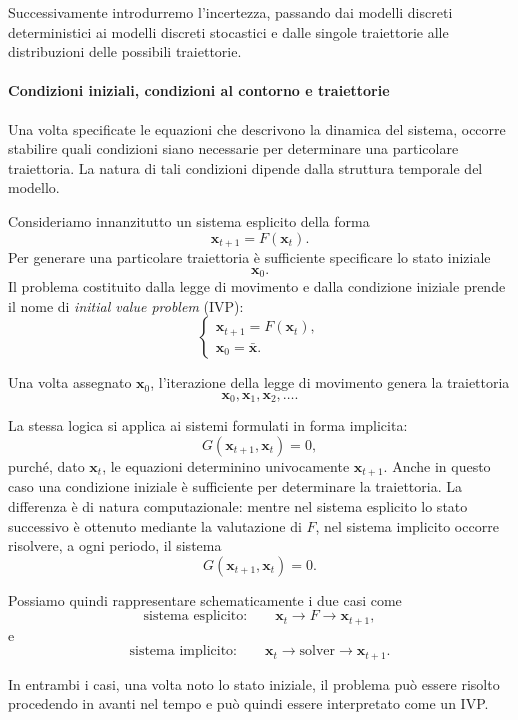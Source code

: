 \documentclass{book}
\begin{document}
Successivamente introdurremo l'incertezza, passando dai modelli
discreti deterministici ai modelli discreti stocastici e dalle singole
traiettorie alle distribuzioni delle possibili traiettorie.


\paragraph{Condizioni iniziali, condizioni al contorno e traiettorie}

Una volta specificate le equazioni che descrivono la dinamica del sistema,
occorre stabilire quali condizioni siano necessarie per determinare una
particolare traiettoria. La natura di tali condizioni dipende dalla
struttura temporale del modello.

Consideriamo innanzitutto un sistema esplicito della forma
\[
\mathbf{x}_{t+1}=F(\mathbf{x}_t).
\]
Per generare una particolare traiettoria è sufficiente specificare lo
stato iniziale
\[
\mathbf{x}_0.
\]
Il problema costituito dalla legge di movimento e dalla condizione
iniziale prende il nome di \emph{initial value problem} (IVP):
\[
\begin{cases}
\mathbf{x}_{t+1}=F(\mathbf{x}_t),\\
\mathbf{x}_0=\bar{\mathbf{x}}.
\end{cases}
\]

Una volta assegnato $\mathbf{x}_0$, l'iterazione della legge di
movimento genera la traiettoria
\[
\mathbf{x}_0,\mathbf{x}_1,\mathbf{x}_2,\ldots.
\]

La stessa logica si applica ai sistemi formulati in forma implicita:
\[
G(\mathbf{x}_{t+1},\mathbf{x}_t)=0,
\]
purché, dato $\mathbf{x}_t$, le equazioni determinino univocamente
$\mathbf{x}_{t+1}$. Anche in questo caso una condizione iniziale è
sufficiente per determinare la traiettoria. La differenza è di natura
computazionale: mentre nel sistema esplicito lo stato successivo è
ottenuto mediante la valutazione di $F$, nel sistema implicito occorre
risolvere, a ogni periodo, il sistema
\[
G(\mathbf{x}_{t+1},\mathbf{x}_t)=0.
\]

Possiamo quindi rappresentare schematicamente i due casi come
\[
\text{sistema esplicito:}
\qquad
\mathbf{x}_t
\longrightarrow
F
\longrightarrow
\mathbf{x}_{t+1},
\]
e
\[
\text{sistema implicito:}
\qquad
\mathbf{x}_t
\longrightarrow
\text{solver}
\longrightarrow
\mathbf{x}_{t+1}.
\]

In entrambi i casi, una volta noto lo stato iniziale, il problema può
essere risolto procedendo in avanti nel tempo e può quindi essere
interpretato come un IVP.
\end{document}
